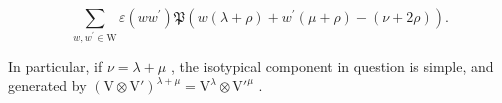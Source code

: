 \[
\sum_ {w, w ^ {\prime} \in \mathrm{W}} \varepsilon (w w ^ {\prime}) \mathfrak {P} (w (\lambda + \rho) + w ^ {\prime} (\mu + \rho) - (\nu + 2 \rho)).
\]

In particular, if \(\nu = \lambda + \mu\) , the isotypical component in question is simple, and generated by \((\mathrm{V} \otimes \mathrm{V}')^{\lambda + \mu} = \mathrm{V}^{\lambda} \otimes \mathrm{V}'^{\mu}\) .

